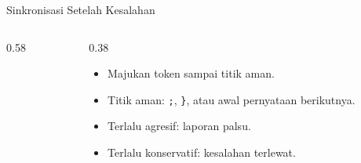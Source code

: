 \documentclass[aspectratio=169,10pt,t]{beamer}
\begin{document}
\begin{frame}[fragile]{Sinkronisasi Setelah Kesalahan}
  \begin{columns}[T,onlytextwidth]
    \begin{column}{0.58\textwidth}
      
    \end{column}
    \begin{column}{0.38\textwidth}
      \begin{itemize}
        \item Majukan token sampai titik aman.
        \item Titik aman: \texttt{;}, \texttt{\}}, atau awal
              pernyataan berikutnya.
        \item Terlalu agresif: laporan palsu.
        \item Terlalu konservatif: kesalahan terlewat.
      \end{itemize}
    \end{column}
  \end{columns}
\end{frame}
\end{document}
